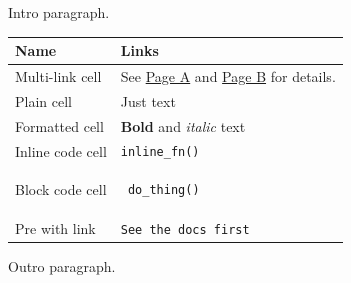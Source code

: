 \documentclass[11pt,a4paper]{article}
\begin{document}
Intro paragraph.

\begin{table}[h]
\begin{tabular}{|l|l|}
\hline
Name & Links \\ \hline
Multi-link cell & See \href{https://example.com/a}{Page A} and \href{https://example.com/b}{Page B} for details. \\ \hline
Plain cell & Just text \\ \hline
Formatted cell & \textbf{Bold} and \textit{italic} text \\ \hline
Inline code cell & \texttt{inline_fn()} \\ \hline
Block code cell & \begin{verbatim} do_thing() \end{verbatim} \\ \hline
Pre with link & \texttt{See }\texttt{the docs}\texttt{ first} \\ \hline
\end{tabular}
\end{table}

Outro paragraph.
\end{document}
